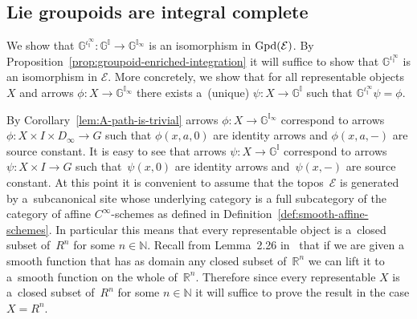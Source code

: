 \documentclass[pdftex]{sigma}
\numberwithin{equation}{section}
\begin{document}
\subsection{Lie groupoids are integral complete}\label{sec:Lie Groupoids are Integral Complete}

We show that $\mathbb{G}^{\iota_{\mathbb{I}}^{\infty}}\colon \mathbb{G}^{\mathbb{I}} \rightarrow\mathbb{G}^{\mathbb{I}_{\infty}}$ is an isomorphism in ${\rm Gpd}(\mathcal{E})$. By Proposition~\ref{prop:groupoid-enriched-integration} it will suf\/f\/ice to show that $\mathbb{G}^{\iota_{\mathbb{I}}^{\infty}}$ is an isomorphism in $\mathcal{E}$. More concretely, we show that for all representable objects $X$ and arrows $\phi\colon X \rightarrow \mathbb{G}^{\mathbb{I}_{\infty}}$ there exists a~(unique) $\psi\colon X \rightarrow \mathbb{G}^{\mathbb{I}}$ such that $\mathbb{G}^{\iota_{\mathbb{I}}^{\infty}}\psi=\phi$.

By Corollary~\ref{lem:A-path-is-trivial} arrows $\phi\colon X \rightarrow \mathbb{G}^{\mathbb{I}_{\infty}}$ correspond to arrows $\phi\colon X\times I\times D_{\infty} \rightarrow G$ such that $\phi(x,a,0)$ are identity arrows and $\phi(x,a,-)$ are source constant. It is easy to see that arrows $\psi\colon X \rightarrow \mathbb{G}^{\mathbb{I}}$ correspond to arrows $\psi\colon X\times I \rightarrow G$ such that~$\psi(x,0)$ are identity arrows and~$\psi(x,-)$ are source constant. At this point it is convenient to assume that the topos~$\mathcal{E}$ is generated by a~subcanonical site whose underlying category is a full subcategory of the category of af\/f\/ine $C^{\infty}$-schemes as def\/ined in Def\/inition~\ref{def:smooth-affine-schemes}. In particular this means that every representable object is a~closed subset of~$R^n$ for some $n\in \mathbb{N}$. Recall from Lemma~2.26 in~\cite{MR2954043} that if we are given a smooth function that has as domain any closed subset of~$\mathbb{R}^n$ we can lift it to a~smooth function on the whole of~$\mathbb{R}^n$. Therefore since every representable $X$ is a~closed subset of~$R^n$ for some $n\in \mathbb{N}$ it will suf\/f\/ice to prove the result in the case $X=R^n$.
\end{document}
